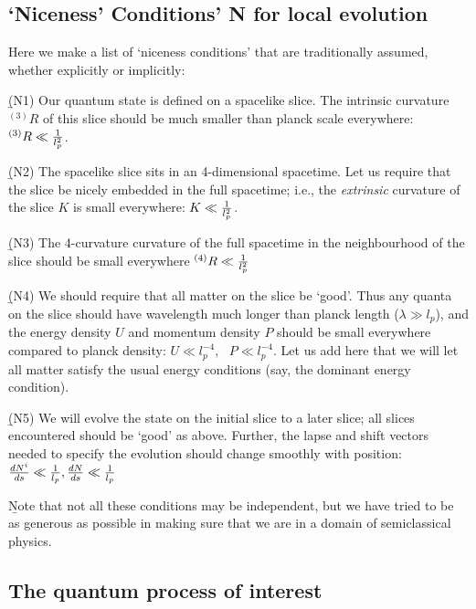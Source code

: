 \documentclass[12pt]{article}
\begin{document}
\subsection{`Niceness' Conditions' N for local evolution}\label{n}


Here we make a list of `niceness conditions' that are traditionally assumed, whether explicitly or implicitly:

\b

(N1) Our quantum state is defined on a spacelike slice. The intrinsic curvature ${}^{(3)} R$ of this slice should be much smaller than planck scale everywhere: ${}^{(3)} R\ll {1\over l_p^2}$. 

\b

(N2) The spacelike slice sits in an 4-dimensional spacetime. Let us require that the slice be nicely embedded in the full spacetime; i.e., the {\it extrinsic} curvature of the slice $K$ is small everywhere: $K\ll {1\over l_p^2}$. 

\b

(N3) The 4-curvature curvature of the full spacetime in the neighbourhood of the slice should be small everywhere ${}^{(4)} R\ll {1\over l_p^2}$

\b


(N4) We should require that all matter on the slice be `good'. Thus any quanta  on the slice should have wavelength much longer than planck length ($\lambda\gg l_p$), and the  energy density $U$ and momentum density $P$ should be small everywhere compared to planck density: $U\ll l_p^{-4}, ~~~P\ll l_p^{-4}$. 
Let us add here that we will let all matter satisfy the usual energy conditions (say, the dominant energy condition). 

\b

(N5) We will evolve the state on the initial slice to a later slice; all slices encountered should be `good' as above. Further, the lapse and shift vectors needed to specify the evolution should change smoothly with position: $
{dN^i\over ds}\ll {1\over l_p}, {dN\over ds}\ll {1\over l_p} $

\b

Note that not all these conditions may be   independent, but we have tried to be as generous as possible in making sure that we are in a domain of semiclassical physics. 

\subsection{The quantum process of interest}
\end{document}

